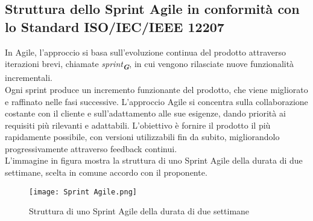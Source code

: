 \newpage

\subsection{Struttura dello Sprint Agile in conformità con lo Standard ISO/IEC/IEEE 12207}
In Agile, l'approccio si basa sull'evoluzione continua del prodotto attraverso iterazioni brevi, chiamate \emph{sprint}\textsubscript{\textit{\textbf{G}}}, in cui vengono rilasciate nuove funzionalità incrementali.\\
Ogni sprint produce un incremento funzionante del prodotto, che viene migliorato e raffinato nelle fasi successive. L'approccio Agile si concentra sulla collaborazione costante con il cliente e sull'adattamento alle sue esigenze, dando priorità ai requisiti più rilevanti e adattabili. L'obiettivo è fornire il prodotto il più rapidamente possibile, con versioni utilizzabili fin da subito, migliorandolo progressivamente attraverso feedback continui.\\
L'immagine in figura  mostra la struttura di uno Sprint Agile della durata di due settimane, scelta in comune accordo con il proponente.\\
\begin{figure}[h] 
    \centering
    \texttt{[image: Sprint Agile.png]}
    \caption{Struttura di uno Sprint Agile della durata di due settimane} 
    \label{fig:Struttura di uno Sprint Agile della durata di due settimane}
\end{figure}

